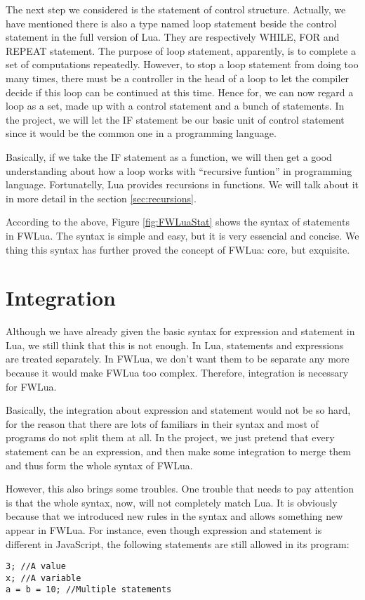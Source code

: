 The next step we considered is the statement of control structure. Actually, we have mentioned there is also a type named loop statement beside the control statement in the full version of Lua. They are respectively WHILE, FOR and REPEAT statement. The purpose of loop statement, apparently, is to complete a set of computations repeatedly. However, to stop a loop statement from doing too many times, there must be a controller in the head of a loop to let the compiler decide if this loop can be continued at this time. Hence for, we can now regard a loop as a set, made up with a control statement and a bunch of statements. In the project, we will let the IF statement be our basic unit of control statement since it would be the common one in a programming language.

Basically, if we take the IF statement as a function, we will then get a good understanding about how a loop works with ``recursive funtion'' in programming language. Fortunatelly, Lua provides recursions in functions. We will talk about it in more detail in the section \ref{sec:recursions}.

According to the above, Figure \ref{fig:FWLuaStat} shows the syntax of statements in FWLua. The syntax is simple and easy, but it is very essencial and concise. We thing this syntax has further proved the concept of FWLua: core, but exquisite.

\section{Integration}
Although we have already given the basic syntax for expression and statement in Lua, we still think that this is not enough. In Lua, statements and expressions are treated separately. In FWLua, we don't want them to be separate any more because it would make FWLua too complex. Therefore, integration is necessary for FWLua.

Basically, the integration about expression and statement would not be so hard, for the reason that there are lots of familiars in their syntax and most of programs do not split them at all. In the project, we just pretend that every statement can be an expression, and then make some integration to merge them and thus form the whole syntax of FWLua. 

However, this also brings some troubles. One trouble that needs to pay attention is that the whole syntax, now, will not completely match Lua. It is obviously because that we introduced new rules in the syntax and allows something new appear in FWLua. For instance, even though expression and statement is different in JavaScript, the following statements are still allowed in its program:
\begin{flushleft}
\tt 3;   //A value\\
\tt x;   //A variable\\
\tt a = b = 10;   //Multiple statements\\
\end{flushleft}


